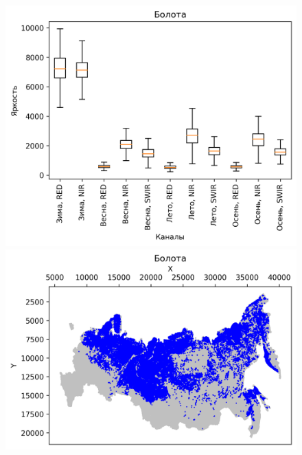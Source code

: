 \documentclass[14pt, a4paper, oneside]{extarticle}
\begin{document}
\begin{figure}[H]
    \centering
    \includegraphics[]{class-6-boxplot}
    \includegraphics[]{class-6-map}
\end{figure}
\end{document}
